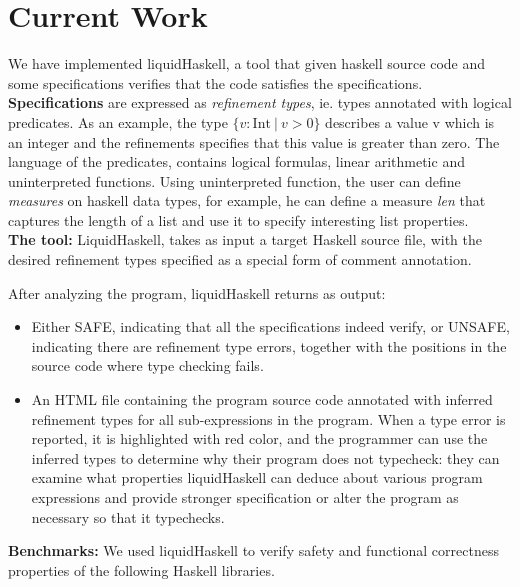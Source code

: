 \section*{Current Work}
We have implemented liquidHaskell, a tool that given haskell source code 
and some specifications 
verifies that the code
satisfies the specifications.\\

\textbf{Specifications}
are expressed as \textit{refinement types}, ie. types annotated with logical predicates.
As an example, the type $\{v : \text{Int}\ |\ v > 0\}$ describes a value v which is an integer 
and the refinements specifies that this value is greater than zero.
%
The language of the predicates, contains logical formulas, linear arithmetic and uninterpreted functions. 
%
Using uninterpreted function, the user can define \textit{measures} on haskell data types, 
for example, he can define a measure \textit{len} that captures the length of a list 
and use it to specify interesting list properties.
\\

\textbf{The tool:}
LiquidHaskell, takes as input
a target Haskell source file, with the desired refinement types specified as a special
form of comment annotation.

After analyzing the program, liquidHaskell returns as output:

\begin{itemize}
\item
 Either SAFE, indicating that all the specifications indeed verify, or UNSAFE, indicating there are refinement type errors, together with the positions in the source
code where type checking fails.
\item
An HTML file containing the program source code annotated with inferred refinement types for all sub-expressions in the program. 
When a type error is reported,  it is highlighted with red color, and the programmer can use the inferred
types to determine why their program does not typecheck: they can examine what
properties liquidHaskell can deduce about various program expressions and 
provide stronger specification or alter the program as necessary so that it typechecks.
\end{itemize}


\textbf{Benchmarks:}
We used liquidHaskell to verify safety and functional correctness properties of the following Haskell libraries.

